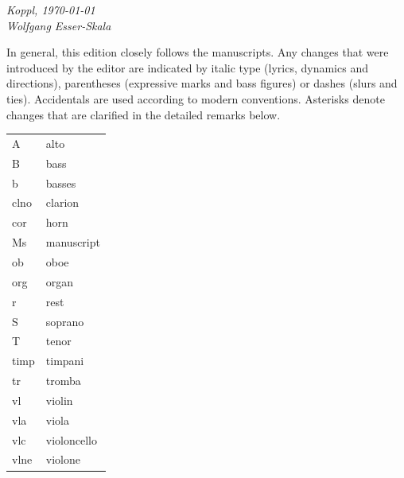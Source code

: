 \documentclass[parskip=full]{scrreprt}
\providecommand\printcriticalnotes{}
\providecommand\setscorelayout{}
\providecommand\printscores{}
\begin{document}
\bigskip
\textit{Koppl, \today\\
Wolfgang Esser-Skala}


\cleardoublepage
\tableofcontents
\cleardoublepage



In general, this edition closely follows the manuscripts. Any changes that were introduced by the editor are indicated by italic type (lyrics, dynamics and directions), parentheses (expressive marks and bass figures) or dashes (slurs and ties). Accidentals are used according to modern conventions. Asterisks denote changes that are clarified in the detailed remarks below.


\begin{tabular}{@{} l l}
  A    & alto \\
  B    & bass \\
  b    & basses \\
  clno & clarion \\
  cor  & horn \\
  Ms   & manuscript \\
  ob   & oboe \\
  org  & organ \\
  r    & rest \\
  S    & soprano \\
  T    & tenor \\
  timp & timpani \\
  tr   & tromba \\
  vl   & violin \\
  vla  & viola \\
  vlc  & violoncello \\
  vlne & violone \\
\end{tabular}

\fi %

\printcriticalnotes



\setscorelayout
\printscores
\end{document}
